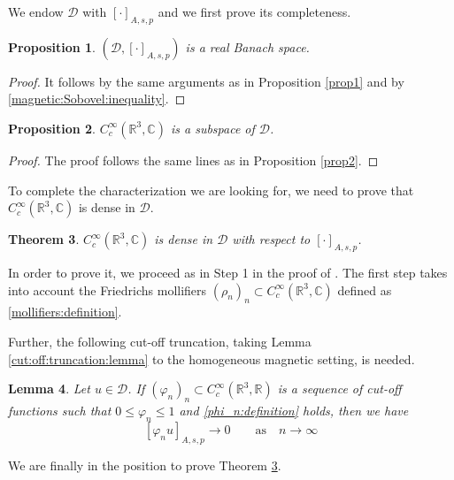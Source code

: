 \documentclass[leqno,11pt]{amsart}
\newcommand{\R}{\mathbb R}
\newcommand{\CC}{\mathbb C}
\newcommand{\cD}{{\mathcal D}}
\numberwithin{equation}{section}
\newtheorem{theorem}{Theorem}[section]
\newtheorem{lemma}[theorem]{Lemma}
\newtheorem{proposition}[theorem]{Proposition}
\begin{document}
We endow $\cD$ with $[\cdot]_{A,s,p}$ and we first prove its completeness.
\begin{proposition}\label{prop1D}
$(\cD, [\cdot]_{A,s,p})$ is a real Banach space.
\end{proposition}
\begin{proof}
It follows by the same arguments as in Proposition \ref{prop1} and by \eqref{magnetic:Sobovel:inequality}.
\end{proof}


\begin{proposition}\label{prop2D}
$C^\infty_c(\R^3,\CC)$ is a subspace of $\cD$.
\end{proposition}
\begin{proof}
The proof follows the same lines as in Proposition \ref{prop2}.
\end{proof}










To complete the characterization we are looking for, we need to prove that $C_c^\infty(\R^3,\CC)$ is dense in $\cD$. 


\begin{theorem}
\label{density:theorem:D}
$C^\infty_c(\R^3,\CC)$ is dense in $\cD$ with respect to $[\cdot]_{A,s,p}$.    
\end{theorem}
In order to prove it, we proceed as in Step 1 in the proof of \cite[Theorem 3.1]{BrascoGV}. The first step takes into account  the Friedrichs mollifiers
$(\rho_n)_n \subset C^\infty_c(\R^3,\CC)$ defined as \eqref{mollifiers:definition}.




Further, the following cut-off truncation, taking Lemma \ref{cut:off:truncation:lemma} to the homogeneous magnetic setting, is needed.



\begin{lemma}
\label{cut:off:truncation:lemmaD}
Let $u \in \cD$. If $(\varphi_n)_n\subset C_c^\infty(\R^3,\R)$ is a sequence of cut-off functions such that $0\le \varphi_n\le 1$ and \eqref{phi_n:definition} holds,
then we have
$$[\varphi_n u]_{A,s,p}\to 0\qquad \text{as}\quad n\to\infty$$  
\end{lemma}



We are finally in the position to prove Theorem \ref{density:theorem:D}.
\end{document}
